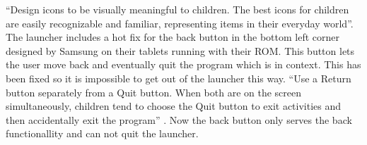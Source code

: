 ``Design icons to be visually meaningful to children. The best icons for children are easily recognizable and familiar, representing items in their everyday world''\citep{microsoft:usability}.  \\
The launcher includes a hot fix for the back button in the bottom left corner designed by Samsung on their tablets running with their ROM. This button lets the user move back and eventually quit the program which is in context. This has been fixed so it is impossible to get out of the launcher this way.
``Use a Return button separately from a Quit button. When both are on the screen simultaneously, children tend to choose the Quit button to exit activities and then accidentally exit the program'' \citep{microsoft:usability}. 
Now the back button only serves the back functionallity and can not quit the launcher.

